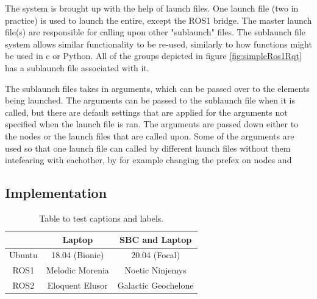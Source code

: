 The system is brought up with the help of launch files. One launch file (two in practice) is used to launch the entire, except the ROS1 bridge. The master launch file(s) are responsible for calling upon other "sublaunch" files. The sublaunch file system allows similar functionality to be re-used, similarly to how functions might be used in c or Python. All of the groups depicted in figure \ref{fig:simpleRos1Rqt} has a sublaunch file associated with it. 

The sublaunch files takes in arguments, which can be passed over to the elements being launched. The arguments can be passed to the sublaunch file when it is called, but there are default settings that are applied for the arguments not specified when the launch file is ran. The arguments are passed down either to the nodes or the launch files that are called upon. Some of the arguments are used so that one launch file can called by different launch files without them intefearing with eachother, by for example changing the prefex on nodes and 

\subsubsection{}


\subsection{Implementation}








%


\begin{table}[h!]
\centering
\begin{tabular}{c |c| c}
                &   Laptop              &   SBC and Laptop  \\
    \hline
    Ubuntu      &   18.04 (Bionic)      &   20.04 (Focal)   \\
    \hline
    ROS1        &   Melodic Morenia     &   Noetic Ninjemys \\  
    \hline
    ROS2        &   Eloquent Elusor     &   Galactic Geochelone\\
\end{tabular}
\caption{Table to test captions and labels.}
\label{table:1}
\end{table}